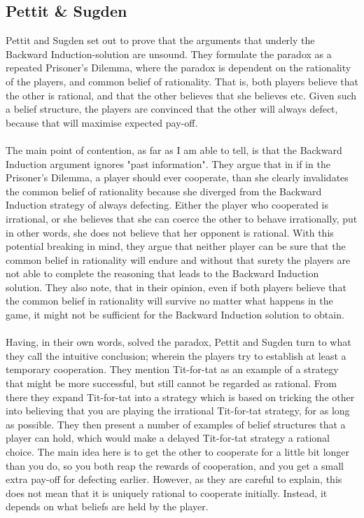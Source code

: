 \documentclass{article}
\begin{document}
\subsection{Pettit \& Sugden}
Pettit and Sugden set out to prove that the arguments that underly the Backward Induction-solution are unsound. They formulate the paradox as a repeated Prisoner's Dilemma, where the paradox is dependent on the rationality of the players, and common belief of rationality. That is, both players believe that the other is rational, and that the other believes that she believes etc. Given such a belief structure, the players are convinced that the other will always defect, because that will maximise expected pay-off.
\\
\\
The main point of contention, as far as I am able to tell, is that the Backward Induction argument ignores "past information". They argue that in if in the Prisoner's Dilemma, a player should ever cooperate, than she clearly invalidates the common belief of rationality because she diverged from the Backward Induction strategy of always defecting. Either the player who cooperated is irrational, or she believes that she can coerce the other to behave irrationally, put in other words, she does not believe that her opponent is rational. With this potential breaking in mind, they argue that neither player can be sure that the common belief in rationality will endure and without that surety the players are not able to complete the reasoning that leads to the Backward Induction solution. They also note, that in their opinion, even if both players believe that the common belief in rationality will survive no matter what happens in the game, it might not be sufficient for the Backward Induction solution to obtain.
\\
\\
Having, in their own words, solved the paradox, Pettit and Sugden turn to what they call the intuitive conclusion; wherein the players try to establish at least a temporary cooperation. They mention Tit-for-tat as an example of a strategy that might be more successful, but still cannot be regarded as rational. From there they expand Tit-for-tat into a strategy which is based on tricking the other into believing that you are playing the irrational Tit-for-tat strategy, for as long as possible. They then present a number of examples of belief structures that a player can hold, which would make a delayed Tit-for-tat strategy a rational choice. The main idea here is to get the other to cooperate for a little bit longer than you do, so you both reap the rewards of cooperation, and you get a small extra pay-off for defecting earlier. However, as they are careful to explain, this does not mean that it is uniquely rational to cooperate initially. Instead, it depends on what beliefs are held by the player. 
\end{document}
